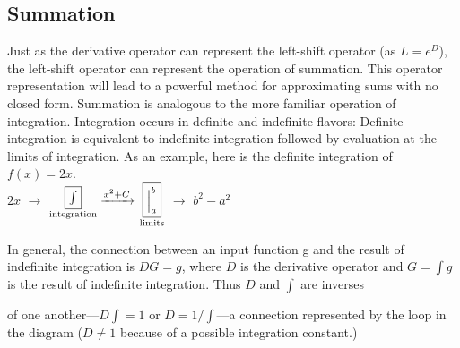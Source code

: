 \documentclass[fleqn]{book}
\begin{document}
\subsection {\Large Summation}



\noindent\Large 
{Just as the derivative operator can represent the left-shift operator (as $L =
e^D$), the left-shift operator can represent the operation of summation. This
operator representation will lead to a powerful method for approximating
sums with no closed form.
Summation is analogous to the more familiar operation of integration.
Integration occurs in definite and indefinite flavors: Definite integration
is equivalent to indefinite integration followed by evaluation at the limits
of integration. As an example, here is the definite integration of $f(x) = 2x$.}
\\


\hangindent=1.5cm {$2x$ $\longrightarrow$ $\underset{\textrm{integration}}{\fbox{\huge{$\int$}}}\xrightarrow{x^2+C}$ $\underset{\textrm{limits}}{\fbox{$\Big|_a^b$}}$} $\longrightarrow$ $b^2-a^2$ \vspace{0.5cm}


\noindent In general, the connection between an input function g and the result of
indefinite integration is $DG = g$, where $D$ is the derivative operator and
$G=\int g$ is the result of indefinite integration. Thus $D$ and $\int$ are inverses\\



\newpage


\pagestyle{fancy}



\renewcommand{\headrulewidth}{0pt}
\fancyhf{}

\noindent \Large {of one another---$D\int=1$ or $D=1/\int$---a connection represented by the loop in the diagram ($D\not=1$ because of a possible integration constant.)}
\\
\\
\\
\end{document}
